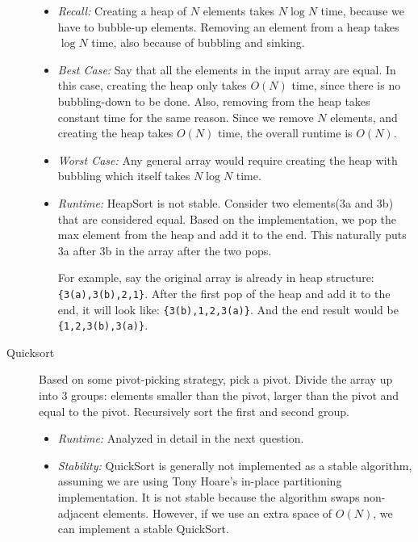 \begin{solution}
\begin{description}
\begin{itemize}
\item \textit{Recall:} Creating a heap of $N$ elements takes $N \log N$ time,
because we have to bubble-up elements. Removing an element from a heap takes
$\log N$ time, also because of bubbling and sinking.
\item \textit{Best Case:} Say that all the elements in the input array are
equal. In this case, creating the heap only takes $O(N)$ time, since there is
no bubbling-down to be done. Also, removing from the heap takes constant time
for the same reason. Since we remove $N$ elements, and creating the heap takes
$O(N)$ time, the overall runtime is $O(N)$.
\item \textit{Worst Case:} Any general array would require creating the heap
with bubbling which itself takes $N \log N$ time.
\item \textit{Runtime:} HeapSort is not stable. Consider two elements(3a and 3b) that are considered equal. Based on the implementation, we pop the max element from the heap and add it to the end. This naturally puts 3a after 3b in the array after the two pops. 

For example, say the original array is already in heap structure:  
\lstinline${3(a),3(b),2,1}$. After the first pop of the heap and add it to the end, it will look like: \lstinline${3(b),1,2,3(a)}$. And the end result would be \lstinline${1,2,3(b),3(a)}$.
\end{itemize}


\item[Quicksort]
Based on some pivot-picking strategy, pick a pivot.  Divide the array up into 3
groups: elements smaller than the pivot, larger than the pivot and equal to the
pivot. Recursively sort the first and second group.

\begin{itemize}
\item \textit{Runtime:} Analyzed in detail in the next question.
\item \textit{Stability:} QuickSort is generally not implemented as a stable algorithm, assuming we are using Tony Hoare’s in-place partitioning implementation. It is not stable because the algorithm swaps non-adjacent elements.  However, if we use an extra space of $O(N)$, we can implement a stable QuickSort.

\end{itemize}
\end{description}
\end{solution}

